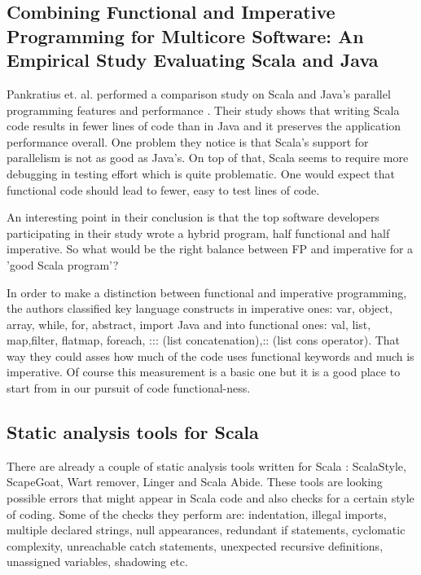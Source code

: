 \documentclass{article}
\begin{document}
\subsection {Combining Functional and Imperative Programming for Multicore Software: An Empirical Study Evaluating Scala and Java}
Pankratius et. al. performed a comparison study on Scala and Java's parallel programming features and performance \cite{Pankratius_combiningfunctional}. Their study shows that writing Scala code results in fewer lines of code than in Java and it preserves the application performance overall. One problem they notice is that Scala's support for parallelism is not as good as Java's. On top of that, Scala seems to require more debugging in testing effort which is quite problematic. One would expect that functional code should lead to fewer, easy to test lines of code. \par

An interesting point in their conclusion is that the top software developers participating in their study wrote a hybrid program, half functional and half imperative. So what would be the right balance between FP and imperative for a 'good Scala program'? \par

In order to make a distinction between functional and imperative programming, the authors classified key language constructs in imperative ones: var, object, array, while, for,
abstract, import Java and into functional ones: val, list, map,filter, flatmap, foreach, ::: (list concatenation),:: (list cons operator). That way they could asses how much of the code uses functional keywords and much is imperative.  Of course this measurement is a basic one but it is a good place to start from in our pursuit of code functional-ness.

\subsection {Static analysis tools for Scala}
There are already a couple of static analysis tools written for Scala : ScalaStyle, ScapeGoat, Wart remover, Linger and Scala Abide. These tools are looking possible errors that might appear in Scala code and also checks for a certain style of coding. Some of the checks they perform are: indentation, illegal imports, multiple declared strings, null appearances, redundant if statements, cyclomatic complexity, unreachable catch statements, unexpected recursive definitions, unassigned variables, shadowing etc. \par
\end{document}
